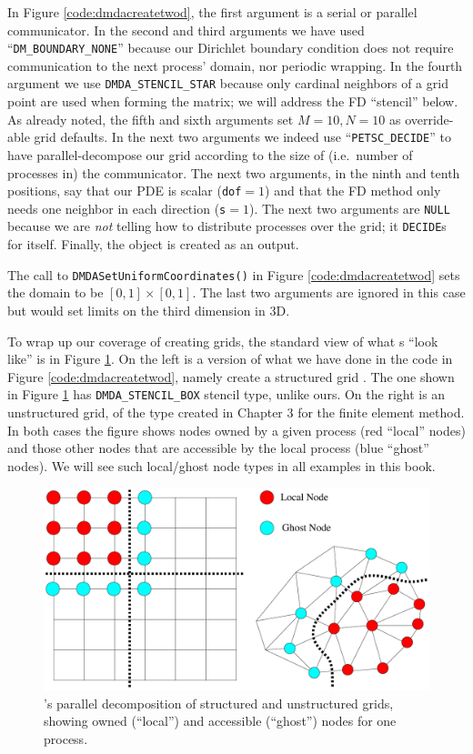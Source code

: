 In Figure \ref{code:dmdacreatetwod}, the first argument is a serial or parallel \MPI communicator.  In the second and third arguments we have used ``\texttt{DM\_BOUNDARY\_NONE}'' because our Dirichlet boundary condition does not require communication to the next process' domain, nor periodic wrapping.  In the fourth argument we use \texttt{DMDA\_STENCIL\_STAR} because only cardinal neighbors of a grid point are used when forming the matrix; we will address the FD ``stencil'' below.  As already noted, the fifth and sixth arguments set $M=10,N=10$ as override-able grid defaults.  In the next two arguments we indeed use ``\texttt{PETSC\_DECIDE}'' to have \PETSc parallel-decompose our grid according to the size of (i.e.~number of processes in) the \MPI communicator.  The next two arguments, in the ninth and tenth positions, say that our PDE is scalar (\texttt{dof}$=1$) and that the FD method only needs one neighbor in each direction (\texttt{s}$=1$).  The next two arguments are \texttt{NULL} because we are \emph{not} telling \PETSc how to distribute processes over the grid; it \texttt{DECIDE}s for itself.  Finally, the \pDMDA object is created as an output.

The call to \texttt{DMDASetUniformCoordinates()} in Figure \ref{code:dmdacreatetwod} sets the domain to be $[0,1]\times[0,1]$.  The last two arguments are ignored in this case but would set limits on the third dimension in 3D.

To wrap up our coverage of creating grids, the standard \PETSc view of what \pDM s ``look like'' is in Figure \ref{fig:petscghostvalues}.  On the left is a version of what we have done in the code in Figure \ref{code:dmdacreatetwod}, namely create a structured grid \pDM.  The one shown in Figure \ref{fig:petscghostvalues} has \texttt{DMDA\_STENCIL\_BOX} stencil type, unlike ours.  On the right is an unstructured grid, of the type created in Chapter 3 for the finite element method.  In both cases the figure shows nodes owned by a given process (red ``local'' nodes) and those other nodes that are accessible by the local process (blue ``ghost'' nodes).  We will see such local/ghost node types in all examples in this book.

\begin{figure}
\includegraphics[width=\textwidth]{petscghostvalues}
\caption{\PETSc's parallel decomposition of structured and unstructured grids, showing owned (``local'') and accessible (``ghost'') nodes for one process.}
\label{fig:petscghostvalues}
\end{figure}


